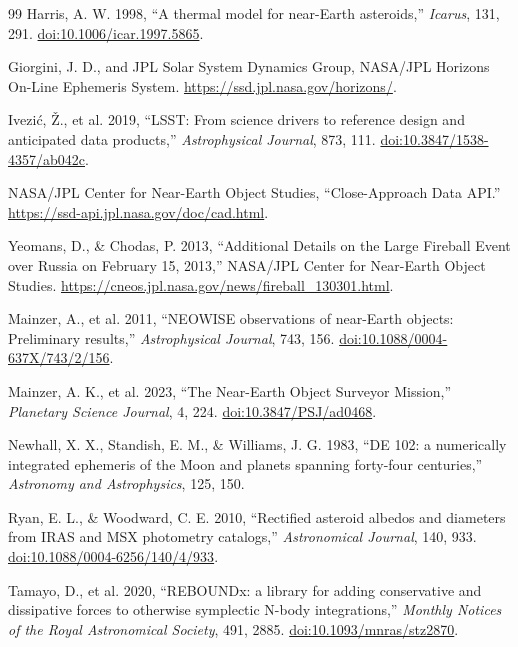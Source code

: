 \begin{thebibliography}{99}
Harris, A. W. 1998,
``A thermal model for near-Earth asteroids,''
\textit{Icarus}, 131, 291.
\href{https://doi.org/10.1006/icar.1997.5865}{doi:10.1006/icar.1997.5865}.

Giorgini, J. D., and JPL Solar System Dynamics Group,
NASA/JPL Horizons On-Line Ephemeris System.
\url{https://ssd.jpl.nasa.gov/horizons/}.

Ivezi\'c, \v{Z}., et al. 2019,
``LSST: From science drivers to reference design and anticipated data
products,''
\textit{Astrophysical Journal}, 873, 111.
\href{https://doi.org/10.3847/1538-4357/ab042c}
{doi:10.3847/1538-4357/ab042c}.

NASA/JPL Center for Near-Earth Object Studies,
``Close-Approach Data API.''
\url{https://ssd-api.jpl.nasa.gov/doc/cad.html}.

Yeomans, D., \& Chodas, P. 2013,
``Additional Details on the Large Fireball Event over Russia on
February 15, 2013,''
NASA/JPL Center for Near-Earth Object Studies.
\url{https://cneos.jpl.nasa.gov/news/fireball_130301.html}.

Mainzer, A., et al. 2011,
``NEOWISE observations of near-Earth objects: Preliminary results,''
\textit{Astrophysical Journal}, 743, 156.
\href{https://doi.org/10.1088/0004-637X/743/2/156}{doi:10.1088/0004-637X/743/2/156}.

Mainzer, A. K., et al. 2023,
``The Near-Earth Object Surveyor Mission,''
\textit{Planetary Science Journal}, 4, 224.
\href{https://doi.org/10.3847/PSJ/ad0468}{doi:10.3847/PSJ/ad0468}.

Newhall, X. X., Standish, E. M., \& Williams, J. G. 1983,
``DE 102: a numerically integrated ephemeris of the Moon and planets spanning
forty-four centuries,''
\textit{Astronomy and Astrophysics}, 125, 150.

Ryan, E. L., \& Woodward, C. E. 2010,
``Rectified asteroid albedos and diameters from IRAS and MSX photometry
catalogs,''
\textit{Astronomical Journal}, 140, 933.
\href{https://doi.org/10.1088/0004-6256/140/4/933}
{doi:10.1088/0004-6256/140/4/933}.

Tamayo, D., et al. 2020,
``REBOUNDx: a library for adding conservative and dissipative forces to
otherwise symplectic N-body integrations,''
\textit{Monthly Notices of the Royal Astronomical Society}, 491, 2885.
\href{https://doi.org/10.1093/mnras/stz2870}{doi:10.1093/mnras/stz2870}.


\end{thebibliography}
